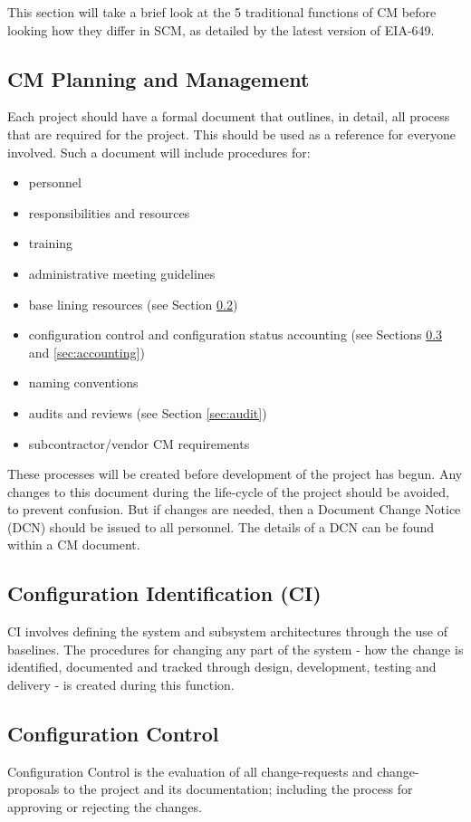 \documentclass[cmpstyle]{ueacmpstyle}
\begin{document}
	This section will take a brief look at the 5 traditional functions of CM before looking how they differ in SCM, as detailed by the latest version of EIA-649.
	
		\subsection{CM Planning and Management} \label{sec:planning}
		Each project should have a formal document that outlines, in detail, all process that are required for the project. This should be used as a reference for everyone involved. Such a document will include procedures for:
		\begin{itemize}
			\item personnel
			\item responsibilities and resources
			\item training
			\item administrative meeting guidelines
			\item base lining resources (see Section \ref{sec:identify})
			\item configuration control and configuration status accounting (see Sections \ref{sec:control} and \ref{sec:accounting})
			\item naming conventions
			\item audits and reviews (see Section \ref{sec:audit})
			\item subcontractor/vendor CM requirements
		\end{itemize}
		These processes will be created before development of the project has begun. Any changes to this document during the life-cycle of the project should be avoided, to prevent confusion. But if changes are needed, then a Document Change Notice (DCN) should be issued to all personnel. The details of a DCN can be found within a CM document.
		
		\subsection{Configuration Identification (CI)} \label{sec:identify}
		CI involves defining the system and subsystem architectures through the use of baselines. The procedures for changing any part of the system - how the change is identified, documented and tracked through design, development, testing and delivery - is created during this function. 
		
		\subsection{Configuration Control} \label{sec:control}
		Configuration Control is the evaluation of all change-requests and change-proposals to the project and its documentation; including the process for approving or rejecting the changes.
		
\end{document}
